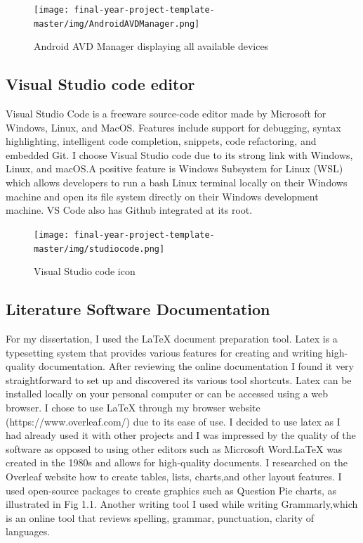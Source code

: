 \begin{figure}[H]
    \centering
    \texttt{[image: final-year-project-template-master/img/AndroidAVDManager.png]}
    \caption{Android AVD Manager displaying all available devices}
    \label{fig:Android AVD Manager}
\end{figure}



\subsection{Visual Studio code editor}
Visual Studio Code is a freeware source-code editor made by Microsoft for Windows, Linux, and MacOS. Features include support for debugging, syntax highlighting, intelligent code completion, snippets, code refactoring, and embedded Git. I choose Visual  Studio code due to its strong link with Windows, Linux, and macOS.A  positive feature is  Windows Subsystem for Linux (WSL) which allows developers to run a bash Linux terminal locally on their Windows machine and open its file system directly on their Windows development machine.  VS Code also has Github integrated at its root. 
 \begin{figure}[H]
  \centering
    \texttt{[image: final-year-project-template-master/img/studiocode.png]}
     \caption{Visual Studio code icon}
\end{figure}



\subsection{Literature Software  Documentation}
For my dissertation, I used the LaTeX document preparation tool.
Latex is a typesetting system that provides various features for creating and writing high-quality documentation. After reviewing the online documentation I found it very straightforward to set up and discovered its various tool shortcuts. Latex can be installed locally on your personal computer or can be accessed using a web browser. I chose to use LaTeX through my browser website  (https://www.overleaf.com/) due to its ease of use. I decided to use latex as I had already used it with other projects and I was  impressed by the quality of the software as opposed to using other editors such as Microsoft Word.LaTeX was created in  the 1980s and allows for high-quality documents. I researched on the Overleaf website how to create tables, lists, charts,and other layout features. I used open-source packages to create graphics such as Question Pie charts, as illustrated in  Fig 1.1. Another writing tool I used while writing  Grammarly,which is  an online tool that reviews spelling, grammar, punctuation, clarity of languages.

